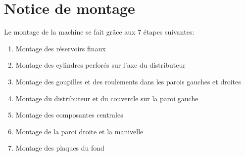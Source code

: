 \chapter{Notice de montage}
Le montage de la machine se fait grâce aux 7 étapes suivantes:

\begin{enumerate}
    \item Montage des réservoirs finaux
    \item Montage des cylindres perforés sur l'axe du distributeur
    \item Montage des goupilles et des roulements dans les parois gauches et droites
    \item Montage du distributeur et du couvercle sur la paroi gauche
    \item Montage des composantes centrales
    \item Montage de la paroi droite et la manivelle
    \item Montage des plaques du fond
\end{enumerate}

\newpage

